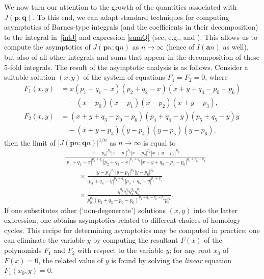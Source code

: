 \documentclass[12pt,reqno]{amsart}
\theoremstyle{remark}
\newcommand\ba{\boldsymbol a}
\newcommand\bp{\boldsymbol p}
\newcommand\bq{\boldsymbol q}
\begin{document}
We now turn our attention to the growth of the quantities associated with $J(\bp;\bq)$. To this end, 
we can adapt standard techniques for computing asymptotics of  Barnes-type integrals (and the coefficients in their decomposition) to the integral in~\eqref{intJ} and expression \eqref{sumQ} (see, e.g., \cite[Sect.~2]{Zu02a} and \cite[Sect.~5]{Zu18}). 
This allows us to compute the asymptotics of $J(\bp n;\bq n)$ as $n\to\infty$ (hence of $I(\ba n)$ as well),
but also of all other integrals and sums that appear in the decomposition of these 5-fold integrals. 
The result of the asymptotic analysis is as follows. Consider a suitable solution $(x,y)$ of the system of equations $F_1=F_2=0$, where
\begin{align*}
F_1(x,y)
&=x(p_1+q_1-x)(p_2+q_2-x)(x+y+q_3-p_0-p_6)
\\ &\quad   
-(x-p_0)(x-p_1)(x-p_2)(x+y-p_3),
\\
F_2(x,y)
&=(x+y+q_3-p_0-p_6)(p_4+q_4-y)(p_5+q_5-y)y
\\ &\quad
-(x+y-p_3)(y-p_4)(y-p_5)(y-p_6), 
\end{align*}
then the limit of $|J(\bp n;\bq n)|^{1/n}$ as $n\to\infty$ is equal to
\begin{align*}
&
\frac{|x-p_0|^{p_0}|x-p_1|^{p_1}|x-p_2|^{p_2}|x+y-p_3|^{p_3}}{|p_1+q_1-x|^{p_1+q_1}|p_2+q_2-x|^{p_1+q_2}|x+y+q_3-p_0-p_6|^{p_0+p_6-q_3}}
\\ &\qquad\times
\frac{|y-p_4|^{p_4}|y-p_5|^{p_5}|y-p_6|^{p_6}}{|p_4+q_4-y|^{p_4+q_4}|p_5+q_5-y|^{p_5+q_5}}
\\ &\qquad\times
\frac{q_1^{q_1}q_2^{q_2}q_4^{q_4}q_5^{q_5}}
{p_0^{p_0}(p_3+q_3-p_0-p_6)^{p_3+q_3-p_0-p_6}p_6^{p_6}}.
\end{align*}
If one substitutes other (`non-degenerate') solutions $(x,y)$  into the latter expression, one obtains  asymptotics related to different choices of homology cycles.
This recipe for determining asymptotics may be computed in practice: one can eliminate the variable $y$ by computing the resultant $F(x)$ of the polynomials $F_1$ and $F_2$ with respect to the variable $y$; for any root $x_0$ of $F(x)=0$, the related value of $y$ is found by solving the \emph{linear} equation $F_1(x_0,y)=0$.
\end{document}
